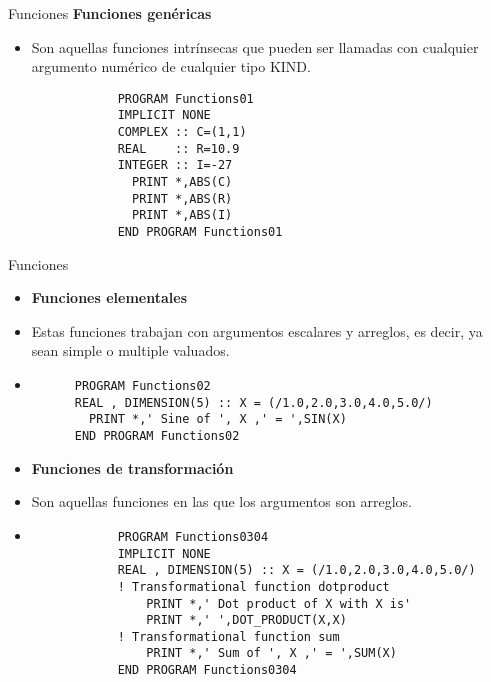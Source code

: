 \begin{frame}[fragile]{Funciones}
\textbf{Funciones genéricas}
 \begin{itemize}[<+(1)->]
  \item Son aquellas funciones intrínsecas que pueden ser llamadas con cualquier argumento numérico de cualquier tipo KIND.
    \vspace{0.1cm}
        \begin{verbatim}
            PROGRAM Functions01
            IMPLICIT NONE
            COMPLEX :: C=(1,1)
            REAL    :: R=10.9
            INTEGER :: I=-27
              PRINT *,ABS(C)
              PRINT *,ABS(R)
              PRINT *,ABS(I)
            END PROGRAM Functions01
        \end{verbatim}
 \end{itemize}
\end{frame}

\begin{frame}[fragile]{Funciones}
 \begin{itemize}[<+(0)->]
  \item [] \textbf{Funciones elementales}
  \item Estas funciones trabajan con argumentos escalares y arreglos, es decir, ya sean simple o multiple valuados.
  \vspace{0.15cm}
  \item[]
      \begin{verbatim}
      PROGRAM Functions02
      REAL , DIMENSION(5) :: X = (/1.0,2.0,3.0,4.0,5.0/)
        PRINT *,' Sine of ', X ,' = ',SIN(X)
      END PROGRAM Functions02
      \end{verbatim}
  \item [] \textbf{Funciones de transformación}
  \item Son aquellas funciones en las que los argumentos son arreglos.
  \vspace{0.15cm}
  \item [] 
        \begin{verbatim}
            PROGRAM Functions0304     
            IMPLICIT NONE
            REAL , DIMENSION(5) :: X = (/1.0,2.0,3.0,4.0,5.0/)
            ! Transformational function dotproduct
                PRINT *,' Dot product of X with X is'
                PRINT *,' ',DOT_PRODUCT(X,X)
            ! Transformational function sum
                PRINT *,' Sum of ', X ,' = ',SUM(X)
            END PROGRAM Functions0304
        \end{verbatim}
 \end{itemize}
\end{frame}

